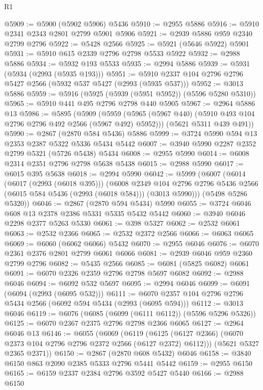 \begin{lexlean}{R1}
\begin{coremodule}
@5909 := @5900 (@5902 @5906) @5436
@5910 := @2955 @5886
@5916 := @5910 @2341 @2343 @2801 @2799 @5901 @5906
@5921 := @2939 @5886 @959 @2340 @2799 @2796
@5922 := @5428 @2566
@5925 := @5921 (@5646 @5922) @5901
@5931 := @5910 @615 @2339 @2796 @2798 @5533 @5922
@5932 := @2988 @5886
@5934 := @5932 @193 @5533
@5935 := @2994 @5886
@5939 := @5931 (@5934 (@2993 (@5935 @193)))
@5951 := @5910 @2337 @104 @2796 @2796 @5427 @2566 (@5932 @537 @5427 (@2993 (@5935 @537)))
@5952 := @3013 @5886
@5959 := @5916 (@5925 (@5939 (@5951 @5952)) (@5596 @5280 @5310))
@5965 := @5910 @441 @495 @2796 @2798 @440 @5905
@5967 := @2964 @5886 @13
@5986 := @5895
    (@5909
      (@5959 (@5965 (@5967 @440) (@5910 @493 @104 @2796 @2796 @492 @2566 (@5967 @492) @5952)))
      (@5621 @5311 @439 @491))
@5990 := @2867 (@2870 @584 @5436) @5886
@5999 := @3724 @5990 @594 @13 @2353 @2387 @5322 @5336 @5434 @5442
@6007 := @3940 @5990 @2287 @2352 @2799 @5321 (@5726 @5438) @5434
@6008 := @2955 @5990
@6014 := @6008 @2314 @2351 @2796 @2798 @5638 @5438
@6015 := @2988 @5990
@6017 := @6015 @395 @5638
@6018 := @2994 @5990
@6042 := @5999
    (@6007
      (@6014
        (@6017 (@2993 (@6018 @395)))
        (@6008
          @2349
          @104
          @2796
          @2796
          @5436
          @2566
          (@6015 @584 @5436 (@2993 (@6018 @584)))
          (@3013 @5990)))
      (@5498 @5286 @5320))
@6046 := @2867 (@2870 @594 @5434) @5990
@6055 := @3724 @6046 @608 @13 @2378 @2386 @5331 @5335 @5432 @5442
@6060 := @3940 @6046 @2298 @2377 @5263 @5330
@6061 := @398 @5327
@6062 := @2532 @6061
@6063 := @2532 @2366
@6065 := @2532 @2372 @2566
@6066 := @6063 @6065
@6069 := @6060 (@6062 @6066) @5432
@6070 := @2955 @6046
@6076 := @6070 @2361 @2376 @2801 @2799 @6061 @6066
@6081 := @2939 @6046 @959 @2360 @2799 @2796
@6082 := @5435 @2566
@6085 := @6081 (@5825 @6082) @6061
@6091 := @6070 @2326 @2359 @2796 @2798 @5697 @6082
@6092 := @2988 @6046
@6094 := @6092 @532 @5697
@6095 := @2994 @6046
@6099 := @6091 (@6094 (@2993 (@6095 @532)))
@6111 := @6070 @2357 @104 @2796 @2796 @5434 @2566 (@6092 @594 @5434 (@2993 (@6095 @594)))
@6112 := @3013 @6046
@6119 := @6076 (@6085 (@6099 (@6111 @6112)) (@5596 @5296 @5326))
@6125 := @6070 @2367 @2375 @2796 @2798 @2366 @6065
@6127 := @2964 @6046 @13
@6146 := @6055
    (@6069
      (@6119 (@6125 (@6127 @2366) (@6070 @2373 @104 @2796 @2796 @2372 @2566 (@6127 @2372) @6112)))
      (@5621 @5327 @2365 @2371))
@6150 := @2867 (@2870 @608 @5432) @6046
@6158 := @3840 @6150 @863 @2090 @2385 @5333 @2796 @5441 @5442
@6159 := @2955 @6150
@6165 := @6159 @2337 @2384 @2796 @3592 @5427 @5440
@6166 := @2988 @6150

\end{coremodule}
\end{lexlean}
